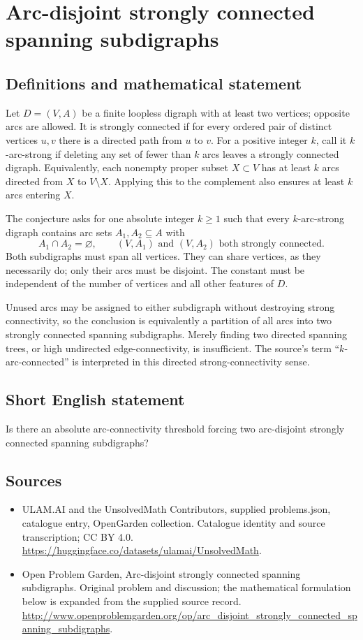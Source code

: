 \documentclass[11pt,a4paper]{article}
\begin{document}
\section*{Arc-disjoint strongly connected spanning subdigraphs}\label{statement}

\subsection{Definitions and mathematical statement}
Let $D=(V,A)$ be a finite loopless digraph with at least two vertices;
opposite arcs are allowed. It is strongly connected if for every ordered
pair of distinct vertices $u,v$ there is a directed path from $u$ to $v$.
For a positive integer $k$, call it $k$-arc-strong if deleting any set
of fewer than $k$ arcs leaves a strongly connected digraph.
Equivalently, each nonempty proper subset $X\subset V$ has at least
$k$ arcs directed from $X$ to $V\setminus X$. Applying this to the
complement also ensures at least $k$ arcs entering $X$.

The conjecture asks for one absolute integer $k\ge1$ such that every
$k$-arc-strong digraph contains arc sets $A_1,A_2\subseteq A$ with
\[
 A_1\cap A_2=\varnothing,\qquad
 (V,A_1)\text{ and }(V,A_2)\text{ both strongly connected}.
\]
Both subdigraphs must span all vertices. They can share vertices, as
they necessarily do; only their arcs must be disjoint. The constant
must be independent of the number of vertices and all other features
of $D$.

Unused arcs may be assigned to either subdigraph without destroying
strong connectivity, so the conclusion is equivalently a partition of
all arcs into two strongly connected spanning subdigraphs. Merely finding
two directed spanning trees, or high undirected edge-connectivity, is
insufficient. The source's term ``$k$-arc-connected'' is interpreted in
this directed strong-connectivity sense.
\subsection{Short English statement}
Is there an absolute arc-connectivity threshold forcing two arc-disjoint strongly connected spanning subdigraphs?
\subsection{Sources}
\begin{itemize}
\item[S1] ULAM.AI and the UnsolvedMath Contributors, supplied problems.json, catalogue entry, OpenGarden collection. Catalogue identity and source transcription; CC BY 4.0.
\url{https://huggingface.co/datasets/ulamai/UnsolvedMath}.
\item[S2] Open Problem Garden, Arc-disjoint strongly connected spanning subdigraphs. Original problem and discussion; the mathematical formulation below is expanded from the supplied source record.
\url{http://www.openproblemgarden.org/op/arc_disjoint_strongly_connected_spanning_subdigraphs}.
\end{itemize}
\end{document}
